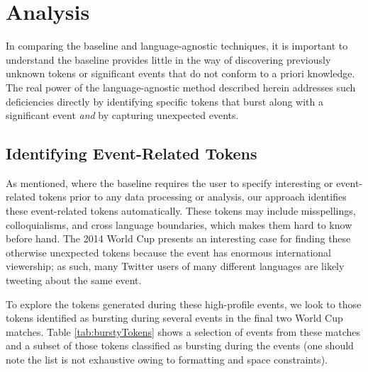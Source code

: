 \documentclass{acm_proc_article-sp}
\begin{document}
\section{Analysis}

In comparing the baseline and language-agnostic techniques, it is important to understand the baseline provides little in the way of discovering previously unknown tokens or significant events that do not conform to a priori knowledge.
The real power of the language-agnostic method described herein addresses such deficiencies directly by identifying specific tokens that burst along with a significant event \emph{and} by capturing unexpected events.

\subsection{Identifying Event-Related Tokens}

As mentioned, where the baseline requires the user to specify interesting or event-related tokens prior to any data processing or analysis, our approach identifies these event-related tokens automatically.
These tokens may include misspellings, colloquialisms, and cross language boundaries, which makes them hard to know before hand.
The 2014 World Cup presents an interesting case for finding these otherwise unexpected tokens because the event has enormous international viewership; as such, many Twitter users of many different languages are likely tweeting about the same event.

To explore the tokens generated during these high-profile events, we look to those tokens identified as bursting during several events in the final two World Cup matches.
Table \ref{tab:burstyTokens} shows a selection of events from these matches and a subset of those tokens classified as bursting during the events (one should note the list is not exhaustive owing to formatting and space constraints).
\end{document}
